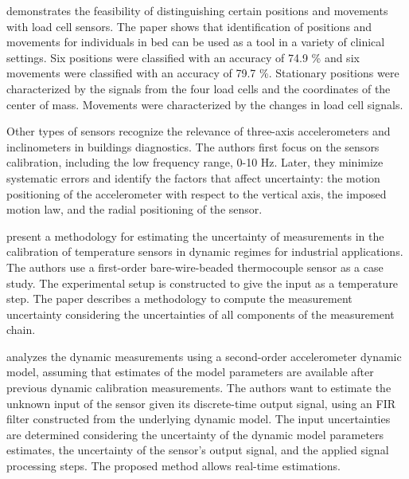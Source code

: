 \documentclass[11pt]{article}
\begin{document}
\citet{Zahradka18} demonstrates the feasibility of distinguishing certain positions and movements with load cell sensors. The paper shows that identification of positions and movements for individuals in bed can be used as a tool in a variety of clinical settings. Six positions were classified with an accuracy of 74.9 \% and six movements were classified with an accuracy of 79.7 \%. Stationary positions were characterized by the signals from the four load cells and the coordinates of the center of mass. Movements were characterized by the changes in load cell signals. 


Other types of sensors
\citet{DEmilia16} recognize the relevance of three-axis accelerometers and inclinometers in buildings diagnostics. The authors first focus on the sensors calibration, including the low frequency range, 0-10 Hz. Later, they minimize systematic errors and identify the factors that affect uncertainty: the motion positioning of the accelerometer with respect to the vertical axis, the imposed motion law, and the radial positioning of the sensor. 

\citet{Diniz17} present a methodology for estimating the uncertainty of measurements in the calibration of temperature sensors in dynamic regimes for industrial applications. The authors use a first-order bare-wire-beaded thermocouple sensor as a case study. The experimental setup is constructed to give the input as a temperature step. The paper describes a methodology to compute the measurement uncertainty considering the uncertainties of all components of the measurement chain.

\citet{Elster07} analyzes the dynamic measurements using a second-order accelerometer dynamic model, assuming that estimates of the model parameters are available after previous dynamic calibration measurements. The authors want to estimate the unknown input of the sensor given its discrete-time output signal, using an FIR filter constructed from the underlying dynamic model. The input  uncertainties are determined considering the uncertainty of the dynamic model parameters estimates, the uncertainty of the sensor's output signal, and the applied signal processing steps. The proposed method allows real-time estimations.
\end{document}
